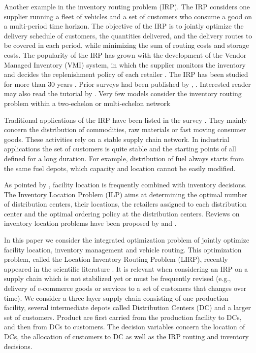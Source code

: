 \documentclass[a4paper,10pt]{article}
\begin{document}
\begin{linenumbers}
Another example in the inventory routing problem (IRP). 
The IRP considers one supplier running a fleet of vehicles and a set of customers who consume a good on a multi-period time horizon. The objective of the IRP is to jointly optimize the delivery schedule of customers, the quantities delivered, and the delivery routes to be covered in each period, while minimizing the sum of routing costs and storage costs. The popularity of the IRP has grown with the development of the Vendor Managed Inventory (VMI) system, in which the supplier monitors the inventory and decides the replenishment policy of each retailer \cite{Archetti2007}. 
The IRP has been studied for more than 30 years \cite{Coelho2014}. Prior surveys had been published by \cite{Campbell98}, \cite{MoinSalhi2007}. Interested reader may also read the tutorial by \cite{Bertazzi2012}. 
Very few models consider the inventory routing problem within a two-echelon or multi-echelon network	\cite{GuimaraesCoelho2019}

Traditional applications of the IRP have been listed in the survey \cite{Coelho2014}. They mainly concern the distribution of commodities, raw materials or fast moving consumer goods. These activities rely on a stable supply chain network. 
In industrial applications the set of customers is quite stable and the starting points of all defined for a long duration.
For example, distribution of fuel always starts from the same fuel depots, which capacity and location cannot be easily modified. 

As pointed by \cite{Melo2009}, facility location is frequently combined with inventory decisions. 
The Inventory Location Problem (ILP) aims at determining the optimal number of distribution centers,  their locations,  the retailers assigned to each distribution center  and the optimal ordering policy at the distribution centers.  Reviews on inventory location problems have been proposed by \cite{kaviani_location-inventory_2009} 
and \cite{farahani_location-inventory_2015}. 

In this paper we consider the integrated optimization problem of jointly optimize facility location, inventory management and vehicle routing. This optimization problem, called the Location Inventory Routing Problem (LIRP), recently appeared in the scientific literature \cite{AhmadiJavid2010}. It is relevant when considering an IRP on a supply chain which is not stabilized yet or must be frequently revised (e.g., delivery of e-commerce goods or services to a set of customers that changes over time). We consider a three-layer supply chain consisting of one production facility, several intermediate depots called Distribution Centers (DC) and a larger set of customers. Product are first carried from the production facility to DCs, and then from DCs to customers. The decision variables concern the location of DCs, the allocation of customers to DC as well as the IRP routing and inventory decisions. 


\end{linenumbers}
\end{document}
